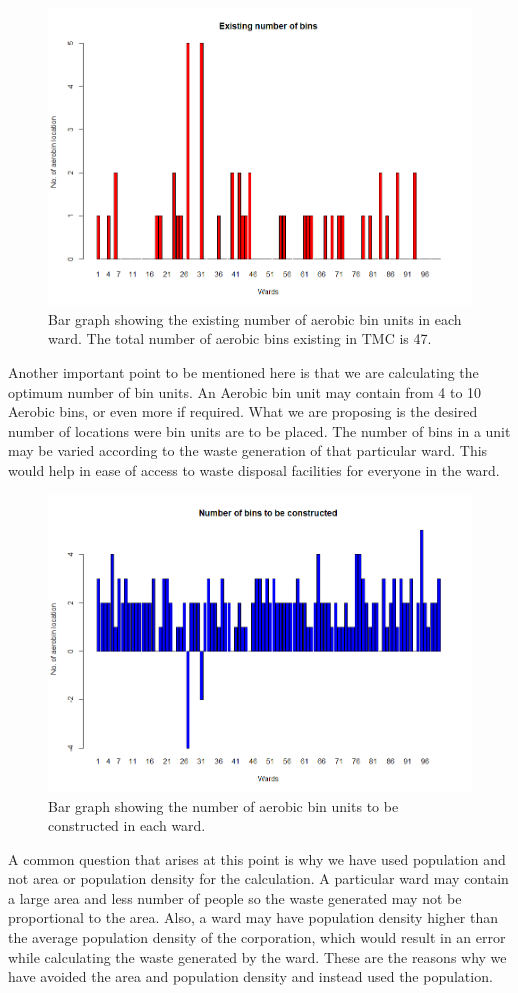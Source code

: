 \documentclass[12pt,a4paper]{report}
\begin{document}
\begin{figure}[H]
	\centering
	\includegraphics[width=0.7\linewidth]{exis}
	\caption{Bar graph showing the existing number of aerobic bin units in each ward. The total number of aerobic bins existing in TMC is 47.}
	\label{fig:exis}
\end{figure}

Another important point to be mentioned here is that we are calculating the optimum number of bin units. An Aerobic bin unit may contain from 4 to 10 Aerobic bins, or even more if required. What we are proposing is the desired number of locations were bin units are to be placed. The number of bins in a unit may be varied according to the waste generation of that particular ward. This would help in ease of access to waste disposal facilities for everyone in the ward.

\begin{figure}[H]
	\centering
	\includegraphics[width=0.7\linewidth]{construc}
	\caption{Bar graph showing the number of aerobic bin units to be constructed in each ward.}
	\label{fig:construc}
\end{figure}

A common question that arises at this point is why we have used population and not area or population density for the calculation. A particular ward may contain a large area and less number of people so the waste generated may not be proportional to the area. Also, a ward may have population density higher than the average population density of the corporation, which would result in an error while calculating the waste generated by the ward. These are the reasons why we have avoided the area and population density and instead used the population.
\end{document}
